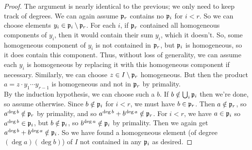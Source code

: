 \begin{proof}
	The argument is nearly identical to the previous; we only need to keep track of degrees. We can again assume $\mathfrak{p}_r$ contains no $\mathfrak{p}_i$ for $i < r$. So we can choose elements $y_i \in \mathfrak{p}_i \setminus \mathfrak{p}_r$. For each $i$, if $\mathfrak{p}_r$ contained all homogeneous components of $y_i$, then it would contain their sum $y_i$, which it doesn't. So, some homogeneous component of $y_i$ is not contained in $\mathfrak{p}_r$, but $\mathfrak{p}_i$ is homogeneous, so it does contain this component. Thus, without loss of generality, we can assume each $y_i$ is homogeneous by replacing it with this homogeneous component if necessary. Similarly, we can choose $z \in I \setminus \mathfrak{p}_r$ homogeneous. But then the product $a = z\cdot y_1 \cdots y_{r-1}$ is homogeneous and not in $\mathfrak{p}_r$ by primality. \\
	
	By the induction hypothesis, we can choose such a $b$. If $b \notin \bigcup_i \mathfrak{p}_i$ then we're done, so assume otherwise. Since $b \notin \mathfrak{p}_i$ for $i < r$, we must have $b \in \mathfrak{p}_r$. Then $a \notin \mathfrak{p}_r$, so $a^{\deg b} \notin \mathfrak{p}_r$ by primality, and so $a^{\deg b} + b^{\deg a} \notin \mathfrak{p}_r$. For $i < r$, we have $a \in \mathfrak{p}_i$ so $a^{\deg b} \in \mathfrak{p}_i$, but $b \notin \mathfrak{p}_i$, so $b^{\deg a} \notin \mathfrak{p}_i$ by primality. Then we again get $a^{\deg b}+b^{\deg a} \notin \mathfrak{p}_i$. So we have found a homogeneous element (of degree $(\deg a)(\deg b)$) of $I$ not contained in any $\mathfrak{p}_i$ as desired.
\end{proof}
